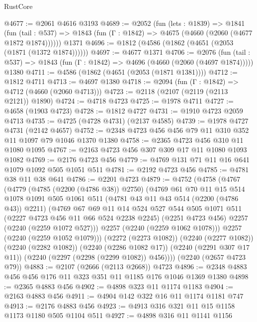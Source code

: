 \begin{lexlean}{RustCore}
\begin{coremodule}
@4677 := @2061 @4616 @3193
@4689 := @2052
    (fun (lets : @1839) =>
    @1841
      (fun (tail : @537) => @1843 (fun (Γ : @1842) => @4675 (@4660 (@2060 (@4677 @1872 @1874))))))
    @1371
@4696 := @1812 (@4586 (@1862 (@4651 (@2053 (@1871 (@1372 @1874))))))
@4697 := @4677 @1371
@4706 := @2076
    (fun (tail : @537) => @1843 (fun (Γ : @1842) => @4696 (@4660 (@2060 (@4697 @1874)))))
    @1380
@4711 := @4586 (@1862 (@4651 (@2053 (@1871 @1381))))
@4712 := @1812 @4711
@4713 := @4697 @1380
@4718 := @2094 (fun (Γ : @1842) => @4712 (@4660 (@2060 @4713)))
@4723 := @2118 (@2107 (@2119 (@2113 @2121)) @1890)
@4724 := @4718 @4723
@4725 := @1978 @4711
@4727 := @4658 (@1903 @4723)
@4728 := @1812 @4727
@4731 := @1910 @4723 @2059 @4713
@4735 := @4725 (@4728 @4731) (@2137 @4585)
@4739 := @1978 @4727 @4731 (@2142 @4657)
@4752 := @2348 @4723 @456 @456 @79 @11 @310 @352 @11 @1097 @79 @1046 @1370 @1380
@4758 := @2365 @4723 @456 @310 @11 @1080 @1095
@4767 := @2163 @4723 @456 @307 @309 @17 @11 @1080 @1093 @1082
@4769 := @2176 @4723 @456
@4779 := @4769 @131 @71 @11 @16 @641 @1079 @1092 @505 @1051 @511
@4781 := @2192 @4723 @456
@4785 := @4781 @38 @11 @38 @641
@4786 := @2201 @4723
@4879 := @4752
    (@4758
      (@4767
        (@4779
          (@4785 (@2200 (@4786 @38)) @2750)
          (@4769
            @61
            @70
            @11
            @15
            @514
            @1078
            @1091
            @505
            @1061
            @511
            (@4781 @43 @11 @43 @514 (@2200 (@4786 @43)) @2211)
            (@4769
              @67
              @69
              @11
              @14
              @524
              @527
              @544
              @505
              @1071
              @511
              (@2227 @4723 @456 @11 @66 @524 @2238 @2245)
              (@2251 @4723 @456)
              @2257
              (@2240 (@2259 @1072 @527)))
            @2257
            (@2240 (@2259 @1062 @1078)))
          @2257
          (@2240 (@2259 @1052 @1079)))
        (@2272 (@2273 @1082))
        (@2240 (@2277 @1082))
        (@2240 (@2282 @1082))
        (@2240 (@2286 @1082 @17))
        (@2240 (@2291 @307 @17 @11))
        (@2240 (@2297 (@2298 (@2299 @1082)) @456))))
    (@2240 (@2657 @4723 @79))
@4883 := @2107 (@2666 (@2113 @2668)) @4723
@4896 := @2348 @4883 @456 @456 @176 @11 @323 @351 @11 @1185 @176 @1046 @1369 @1380
@4898 := @2365 @4883 @456
@4902 := @4898 @323 @11 @1174 @1183
@4904 := @2163 @4883 @456
@4911 := @4904 @142 @322 @16 @11 @1174 @1181 @747
@4913 := @2176 @4883 @456
@4923 := @4913 @316 @321 @11 @15 @1158 @1173 @1180 @505 @1104 @511
@4927 := @4898 @316 @11 @1141 @1156

\end{coremodule}
\end{lexlean}
